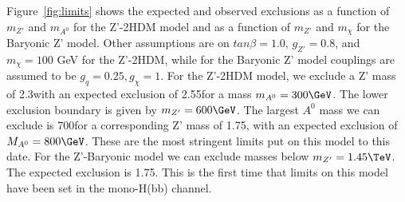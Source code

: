 Figure~\ref{fig:limits} shows the expected and observed exclusions as a function of $m_{Z'}$ and $m_{A^0}$ for the Z'-2HDM model and as a function of $m_{Z'}$ and $m_{\chi}$ for the Baryonic Z' model. Other assumptions are on $tan\beta = 1.0$, $g_{Z'} = 0.8$, and $m_{\chi} = 100$ GeV for the Z'-2HDM, while for the Baryonic Z' model couplings are assumed to be $g_{q} = 0.25, g_{\chi}=1$. For the Z'-2HDM model, we exclude a Z' mass of 2.3\TeV with an expected exclusion of 2.55\TeV for a mass $m_{A^0}=300\GeV$. The lower exclusion boundary is given by $m_{Z'}=600\GeV$. The largest $A^0$ mass we can exclude is 700\GeV for a corresponding Z' mass of 1.75\TeV, with an expected exclusion of $M_{A^0}=800\GeV$. These are the most stringent limits put on this model to this date. For the Z'-Baryonic model we can exclude masses below $m_{Z'}=1.45\TeV$. The expected exclusion is 1.75\TeV. This is the first time that limits on this model have been set in the mono-H(bb) channel. 

